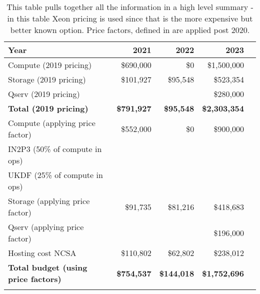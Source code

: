 \tiny \begin{longtable} { |p{}  |r  |r  |r  |r |} 
\caption{This table pulls together all the information in a high level summary - in this table Xeon pricing is used since that is the more expensive but better known option. Price factors, defined in  are applied post 2020.
 \label{tab:Summary}}\\ 
\hline 
\textbf{Year}&\textbf{2021}&\textbf{2022}&\textbf{2023} \\ \hline
{Compute (2019 pricing)}&{\$690,000}&{\$0}&{\$1,500,000} \\ \hline
{Storage (2019 pricing)}&{\$101,927}&{\$95,548}&{\$523,354} \\ \hline
{Qserv (2019 pricing)}&{}&{}&{\$280,000} \\ \hline
\textbf{Total (2019 pricing)}&\textbf{\$791,927}&\textbf{\$95,548}&\textbf{\$2,303,354} \\ \hline
{Compute (applying price factor)}&{\$552,000}&{\$0}&{\$900,000} \\ \hline
{IN2P3 (50\% of compute in ops)}&{}&{}&{} \\ \hline
{UKDF (25\% of compute in ops)}&{}&{}&{} \\ \hline
{Storage (applying price factor)}&{\$91,735}&{\$81,216}&{\$418,683} \\ \hline
{Qserv (applying price factor)}&{}&{}&{\$196,000} \\ \hline
{Hosting cost NCSA
}&{\$110,802}&{\$62,802}&{\$238,012} \\ \hline
\textbf{Total budget (using price factors)}&\textbf{\$754,537}&\textbf{\$144,018}&\textbf{\$1,752,696} \\ \hline
{}&{}&{}&{} \\ \hline
\end{longtable} \normalsize
